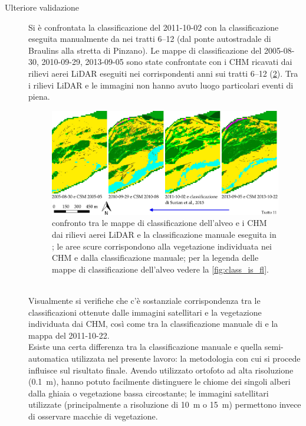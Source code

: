 \begin{description}
\begin{figure}
		\label{fig:b-media-7-e-15}
	\end{figure}
	\item[Ulteriore validazione] Si è confrontata la classificazione del 2011-10-02 con la classificazione eseguita manualmente da  nei tratti \numrange[range-phrase={$\div$}]{6}{12} (dal ponte autostradale di Braulins alla stretta di Pinzano).
	Le mappe di classificazione del 2005-08-30, 2010-09-29, 2013-09-05 sono state confrontate con i CHM ricavati dai rilievi aerei LiDAR eseguiti nei corrispondenti anni sui tratti \numrange[range-phrase={$\div$}]{6}{12} (\cref{fig:validazione-class-is-fl}).
	Tra i rilievi LiDAR e le immagini \AST{} non hanno avuto luogo particolari eventi di piena.
	\begin{figure}
		\centering
		\includegraphics[width=\textwidth]{files/class_mia_vs_surian_chm.jpeg}
		\caption[validazione della classificazione dell'alveo]{confronto tra le mappe di classificazione dell'alveo e i CHM dai rilievi aerei LiDAR e la classificazione manuale eseguita in ; le aree scure corrispondono alla vegetazione individuata nei CHM e dalla classificazione manuale; per la legenda delle mappe di classificazione dell'alveo vedere la \cref{fig:class_is_fl}.}
		\label{fig:validazione-class-is-fl}
	\end{figure}
	\\
	Visualmente si verifiche che c'è sostanziale corrispondenza tra le classificazioni ottenute dalle immagini satellitari e la vegetazione individuata dai CHM, così come tra la classificazione manuale di  e la mappa del 2011-10-22.
	\\
	Esiste una certa differenza tra la classificazione manuale e quella semi-automatica utilizzata nel presente lavoro: la metodologia con cui si procede influisce sul risultato finale.
	Avendo  utilizzato ortofoto ad alta risoluzione (\SI{0.1}{\m}), hanno potuto facilmente distinguere le chiome dei singoli alberi dalla ghiaia o vegetazione bassa circostante; le immagini satellitari utilizzate (principalmente a risoluzione di \SI{10}{\m} o \SI{15}{\m}) permettono invece di osservare macchie di vegetazione.

\end{description}
